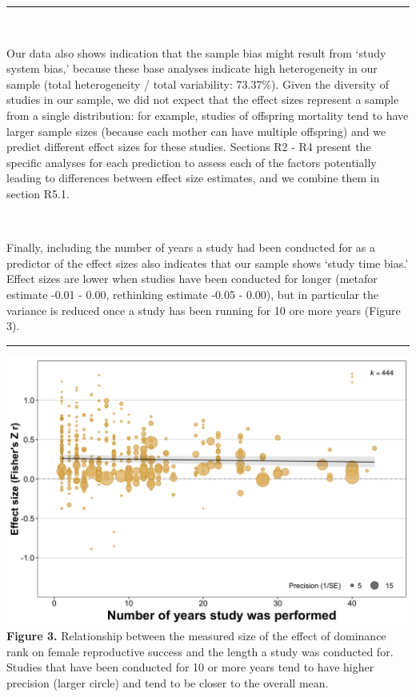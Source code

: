\documentclass[
]{article}
\begin{document}
\begin{center}\rule{0.5\linewidth}{0.5pt}\end{center}

~

Our data also shows indication that the sample bias might result from
`study system bias,' because these base analyses indicate high
heterogeneity in our sample (total heterogeneity / total variability:
73.37\%). Given the diversity of studies in our sample, we did not
expect that the effect sizes represent a sample from a single
distribution: for example, studies of offspring mortality tend to have
larger sample sizes (because each mother can have multiple offspring)
and we predict different effect sizes for these studies. Sections R2 -
R4 present the specific analyses for each prediction to assess each of
the factors potentially leading to differences between effect size
estimates, and we combine them in section R5.1.

~

Finally, including the number of years a study had been conducted for as
a predictor of the effect sizes also indicates that our sample shows
`study time bias.' Effect sizes are lower when studies have been
conducted for longer (metafor estimate -0.01 - 0.00, rethinking estimate
-0.05 - 0.00), but in particular the variance is reduced once a study
has been running for 10 ore more years (Figure 3).

\begin{center}\rule{0.5\linewidth}{0.5pt}\end{center}

\includegraphics{ranksuccess_Fig3_effectsize_noyears.png} \textbf{Figure
3.} Relationship between the measured size of the effect of dominance
rank on female reproductive success and the length a study was conducted
for. Studies that have been conducted for 10 or more years tend to have
higher precision (larger circle) and tend to be closer to the overall
mean.
\end{document}

